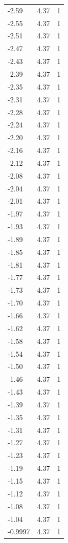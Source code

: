 \begin{longtable}{lrr}
  -2.59 & 4.37 & 1 \\
  -2.55 & 4.37 & 1 \\
  -2.51 & 4.37 & 1 \\
  -2.47 & 4.37 & 1 \\
  -2.43 & 4.37 & 1 \\
  -2.39 & 4.37 & 1 \\
  -2.35 & 4.37 & 1 \\
  -2.31 & 4.37 & 1 \\
  -2.28 & 4.37 & 1 \\
  -2.24 & 4.37 & 1 \\
  -2.20 & 4.37 & 1 \\
  -2.16 & 4.37 & 1 \\
  -2.12 & 4.37 & 1 \\
  -2.08 & 4.37 & 1 \\
  -2.04 & 4.37 & 1 \\
  -2.01 & 4.37 & 1 \\
  -1.97 & 4.37 & 1 \\
  -1.93 & 4.37 & 1 \\
  -1.89 & 4.37 & 1 \\
  -1.85 & 4.37 & 1 \\
  -1.81 & 4.37 & 1 \\
  -1.77 & 4.37 & 1 \\
  -1.73 & 4.37 & 1 \\
  -1.70 & 4.37 & 1 \\
  -1.66 & 4.37 & 1 \\
  -1.62 & 4.37 & 1 \\
  -1.58 & 4.37 & 1 \\
  -1.54 & 4.37 & 1 \\
  -1.50 & 4.37 & 1 \\
  -1.46 & 4.37 & 1 \\
  -1.43 & 4.37 & 1 \\
  -1.39 & 4.37 & 1 \\
  -1.35 & 4.37 & 1 \\
  -1.31 & 4.37 & 1 \\
  -1.27 & 4.37 & 1 \\
  -1.23 & 4.37 & 1 \\
  -1.19 & 4.37 & 1 \\
  -1.15 & 4.37 & 1 \\
  -1.12 & 4.37 & 1 \\
  -1.08 & 4.37 & 1 \\
  -1.04 & 4.37 & 1 \\
  -0.9997 & 4.37 & 1 \\

\end{longtable}
